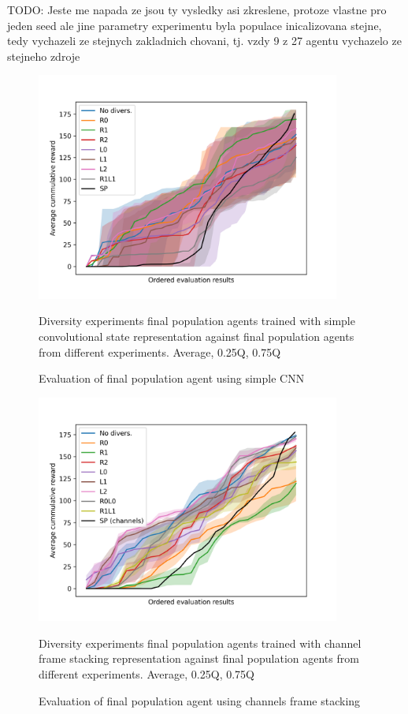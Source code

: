 {\color{blue} TODO: Jeste me napada ze jsou ty vysledky asi zkreslene, protoze vlastne pro jeden seed ale jine parametry experimentu byla populace inicalizovana stejne, tedy vychazeli ze stejnych zakladnich chovani, tj. vzdy 9 z 27 agentu vychazelo ze stejneho zdroje}
\begin{figure}[!ht]
    \centering
    \includegraphics*[width=10cm]{../img/FinalPopFinalPopSimpleCnnAvg.png}

    \caption{Evaluation of final population agent using simple CNN}
    \label{FinalPopFinalPopSimpleCnnAvg}
    \medskip
    \small 
    Diversity experiments final population agents trained with simple convolutional state representation against final population agents from different experiments. 
    Average, 0.25Q, 0.75Q

\end{figure}

\begin{figure}[!ht]
    \centering
    \includegraphics*[width=10cm]{../img/FinalPopFinalPopFsChannelsAvg.png}

    \caption{Evaluation of final population agent using channels frame stacking}
    \label{FinalPopFinalPopFsChannelsAvg}
    \medskip
    \small 
    Diversity experiments final population agents trained with channel frame stacking representation against final population agents from different experiments.
    Average, 0.25Q, 0.75Q

\end{figure}

